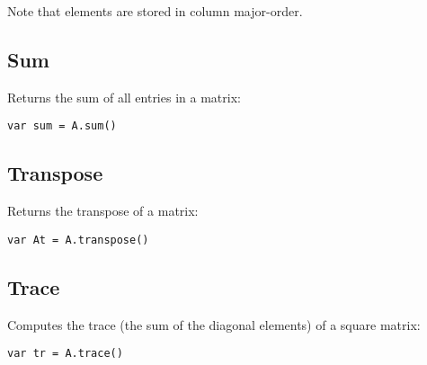 Note that elements are stored in column major-order.

\hypertarget{sum}{%
\subsection{Sum}\label{sum}}

Returns the sum of all entries in a matrix:

\begin{lstlisting}
var sum = A.sum() 
\end{lstlisting}

\hypertarget{transpose}{%
\subsection{Transpose}\label{transpose}}

Returns the transpose of a matrix:

\begin{lstlisting}
var At = A.transpose()
\end{lstlisting}

\hypertarget{trace}{%
\subsection{Trace}\label{trace}}

Computes the trace (the sum of the diagonal elements) of a square
matrix:

\begin{lstlisting}
var tr = A.trace()
\end{lstlisting}
